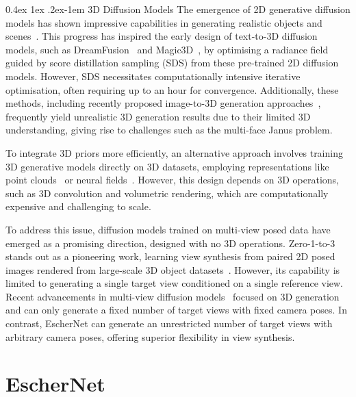 \documentclass[10pt,twocolumn,letterpaper]{article}
\makeatletter
\renewcommand{\paragraph}{%
  \@startsection{paragraph}{4}%
  {\z@}{0.4ex \@plus 1ex \@minus .2ex}{-1em}%
  {\normalfont\normalsize\bfseries}%
}
\makeatother
\begin{document}
\paragraph{3D Diffusion Models} The emergence of 2D generative diffusion models has shown impressive capabilities in generating realistic objects and scenes~\cite{ho2020ddpm, rombach2022ldm}. This progress has inspired the early design of text-to-3D diffusion models, such as DreamFusion~\cite{poole2022dreamfusion} and Magic3D~\cite{lin2023magic3d}, by optimising a radiance field guided by score distillation sampling (SDS) from these pre-trained 2D diffusion models. However, SDS necessitates computationally intensive iterative optimisation, often requiring up to an hour for convergence. Additionally, these methods, including recently proposed image-to-3D generation approaches~\cite{deng2023nerdi, xu2023neurallift, melas2023realfusion}, frequently yield unrealistic 3D generation results due to their limited 3D understanding, giving rise to challenges such as the multi-face Janus problem.

To integrate 3D priors more efficiently, an alternative approach involves training 3D generative models directly on 3D datasets, employing representations like point clouds~\cite{nichol2022pointe} or neural fields~\cite{erkocc2023hyperdiffusion, chen2023single, jun2023shape}. However, this design depends on 3D operations, such as 3D convolution and volumetric rendering, which are computationally expensive and challenging to scale.

To address this issue, diffusion models trained on multi-view posed data have emerged as a promising direction, designed with no 3D operations. Zero-1-to-3~\cite{liu2023zero} stands out as a pioneering work, learning view synthesis from paired 2D posed images rendered from large-scale 3D object datasets~\cite{deitke2023objaverse,deitke2023objaversexl}. However, its capability is limited to generating a single target view conditioned on a single reference view. Recent advancements in multi-view diffusion models~\cite{shi2023mvdream, ye2023consistent123, shi2023zero123++, liu2023syncdreamer, long2023wonder3d, liu2023one} focused on 3D generation and can only generate a fixed number of target views with fixed camera poses. In contrast, EscherNet can generate an unrestricted number of target views with arbitrary camera poses, offering superior flexibility in view synthesis.


\section{EscherNet}
\end{document}
